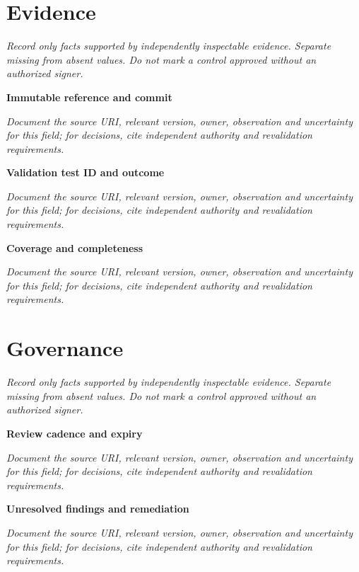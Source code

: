 \documentclass[11pt,letterpaper]{article}
\begin{document}
\section{Evidence}
\noindent\emph{Record only facts supported by independently inspectable evidence. Separate missing from absent values. Do not mark a control approved without an authorized signer.}\par
\noindent\textbf{Immutable reference and commit}\par
\noindent\emph{Document the source URI, relevant version, owner, observation and uncertainty for this field; for decisions, cite independent authority and revalidation requirements.}\par\medskip
\noindent\textbf{Validation test ID and outcome}\par
\noindent\emph{Document the source URI, relevant version, owner, observation and uncertainty for this field; for decisions, cite independent authority and revalidation requirements.}\par\medskip
\noindent\textbf{Coverage and completeness}\par
\noindent\emph{Document the source URI, relevant version, owner, observation and uncertainty for this field; for decisions, cite independent authority and revalidation requirements.}\par\medskip
\section{Governance}
\noindent\emph{Record only facts supported by independently inspectable evidence. Separate missing from absent values. Do not mark a control approved without an authorized signer.}\par
\noindent\textbf{Review cadence and expiry}\par
\noindent\emph{Document the source URI, relevant version, owner, observation and uncertainty for this field; for decisions, cite independent authority and revalidation requirements.}\par\medskip
\noindent\textbf{Unresolved findings and remediation}\par
\noindent\emph{Document the source URI, relevant version, owner, observation and uncertainty for this field; for decisions, cite independent authority and revalidation requirements.}\par\medskip
\end{document}
